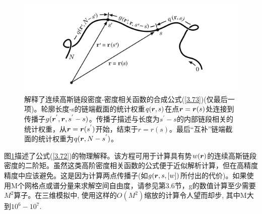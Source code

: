 \begin{figure}[h]
\centering
\includegraphics[width=15cm]{./figures/33.png}
\caption{解释了连续高斯链段密度-密度相关函数的合成公式(\ref{3.73})(仅最后一项)。轮廓长度-s的链端截面的统计权重$q(\bm{r},s)$在点$\bm{r}=\bm{r}(s)$处连接到传播子$g(\bm{r}^{'},\bm{r},s^{'}-s)$。传播子描述与长度为$s^{'}-s$的内部链段相关的统计权重，从$\bm{r}=\bm{r}(s^{'})$开始，结束于$r=r(s)$。最后“互补”链端截面的统计权重为$q(\bm{r},N-s^{'})$。}
\label{figure2}
\end{figure}

图\ref{figure2}描述了公式(\ref{3.72})的物理解释。该方程可用于计算具有势$w(\bm{r})$的连续高斯链段密度的二阶矩。虽然这类高阶密度相关函数的公式便于近似解析计算，但在高精度精度中应该避免。这是因为计算两点传播子(如$g(\bm{r},s,[w])$所付出的代价)。如果使用M个网格点或谱分量来求解空间自由度，请参见第3.6节，g的数值计算至少需要$M^2$算子。在三维模拟中, 使用这样的$O(M^2)$缩放的计算令人望而却步, 其中M大到$10^6-10^7$.
